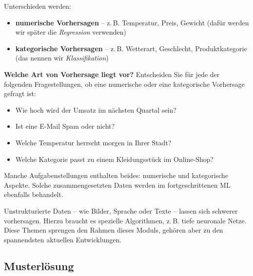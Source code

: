 \begin{lpu}
\begin{theorie}
Unterschieden werden:
\begin{itemize}
  \item \textbf{numerische Vorhersagen} – z.\,B. Temperatur, Preis, Gewicht (dafür werden wir später die \emph{Regression} verwenden)
  \item \textbf{kategorische Vorhersagen} – z.\,B. Wetterart, Geschlecht, Produktkategorie (das nennen wir \emph{Klassifikation})
\end{itemize}
\end{theorie}

\begin{aufgabe}{6}
\textbf{Welche Art von Vorhersage liegt vor?} Entscheiden Sie f\"ur jede der folgenden Fragestellungen, ob eine numerische oder eine kategorische Vorhersage gefragt ist:
\begin{itemize}
  \item Wie hoch wird der Umsatz im n\"achsten Quartal sein?
  \item Ist eine E-Mail Spam oder nicht?
  \item Welche Temperatur herrscht morgen in Ihrer Stadt?
  \item Welche Kategorie passt zu einem Kleidungsst\"uck im Online-Shop?
\end{itemize}
\end{aufgabe}

\begin{hinweis}
Manche Aufgabenstellungen enthalten beides: numerische und kategorische Aspekte. Solche \glqq zusammengesetzten\grqq{} Daten werden im fortgeschrittenen ML ebenfalls behandelt.
\end{hinweis}

Unstrukturierte Daten – wie Bilder, Sprache oder Texte – lassen sich schwerer vorhersagen. Hierzu braucht es spezielle Algorithmen, z.\,B. tiefe neuronale Netze. Diese Themen sprengen den Rahmen dieses Moduls, geh\"oren aber zu den spannendsten aktuellen Entwicklungen.
\end{lpu}

\subsection*{Musterlösung}

